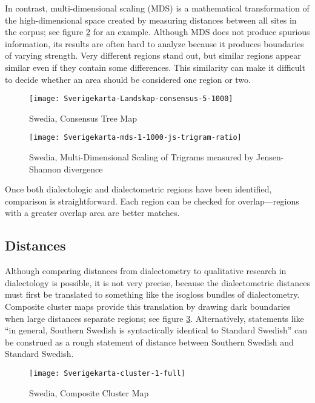In contrast, multi-dimensional scaling (MDS) is a mathematical
transformation of the high-dimensional space created by measuring
distances between all sites in the corpus; see figure
\ref{mds-example-small} for an example. Although MDS does not produce
spurious information, its results are often hard to analyze because it
produces boundaries of varying strength. Very different regions stand
out, but similar regions appear similar even if they contain some
differences. This similarity can make it difficult to decide whether
an area should be considered one region or two.

\begin{figure}
  \texttt{[image: Sverigekarta-Landskap-consensus-5-1000]}
 \caption{Swedia, Consensus Tree Map}
  \label{consensus-example-small}
\end{figure}

\begin{figure}
  \texttt{[image: Sverigekarta-mds-1-1000-js-trigram-ratio]}
 \caption{Swedia, Multi-Dimensional Scaling of Trigrams measured by
    Jensen-Shannon divergence}
  \label{mds-example-small}
\end{figure}

Once both dialectologic and dialectometric regions have been
identified, comparison is straightforward. Each region can be checked
for overlap---regions with a greater overlap area are better matches.

\subsection{Distances}

Although comparing distances from dialectometry to qualitative
research in dialectology is possible, it is not very precise, because
the dialectometric distances must first be translated to something
like the isogloss bundles of dialectometry. Composite cluster maps
provide this translation by drawing dark boundaries when large
distances separate regions; see figure
\ref{composite-example-small}. Alternatively, statements like ``in
general, Southern Swedish is syntactically identical to Standard
Swedish'' \cite{rosenkvist07} can be construed as a rough statement of
distance between Southern Swedish and Standard Swedish.

\begin{figure}
  \texttt{[image: Sverigekarta-cluster-1-full]}
 \caption{Swedia, Composite Cluster Map}
  \label{composite-example-small}
\end{figure}


